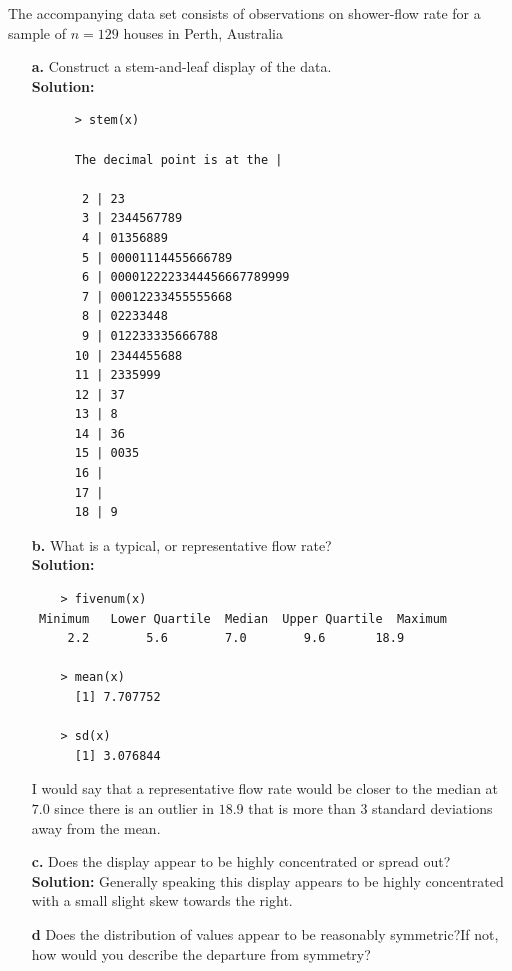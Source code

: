 \documentclass[12pt]{article}
\makeatletter
\theoremstyle{homework}
\newenvironment{exercise}[1]
{\def\@currentlabel{#1}\exercisecore}
{\endexercisecore}
\makeatother
\begin{document}
\begin{exercise}{1.14} The accompanying data set consists of observations on shower-flow rate for a sample of $n = 129$ houses in Perth, Australia
  \begin{enumerate}
    \item[\textbf{a.}] Construct a stem-and-leaf display of the data.\\
    \textbf{Solution:}
    \begin{lstlisting}
      > stem(x)

      The decimal point is at the |
    
       2 | 23
       3 | 2344567789
       4 | 01356889
       5 | 00001114455666789
       6 | 0000122223344456667789999
       7 | 00012233455555668
       8 | 02233448
       9 | 012233335666788
      10 | 2344455688
      11 | 2335999
      12 | 37
      13 | 8
      14 | 36
      15 | 0035
      16 | 
      17 | 
      18 | 9    
    \end{lstlisting}

    \vspace{.5in}
     
    \item[\textbf{b.}] What is a typical, or representative flow rate?\\
    
    \textbf{Solution:}
    
    \begin{lstlisting}
    > fivenum(x)
 Minimum   Lower Quartile  Median  Upper Quartile  Maximum 
     2.2        5.6        7.0        9.6       18.9 
      
    > mean(x)
      [1] 7.707752
  
    > sd(x)
      [1] 3.076844
    \end{lstlisting}
    I would say that a representative flow rate would be closer to the median at $7.0$ since there is an outlier in $18.9$ that is more than 3 standard deviations away from the mean.
    \vspace{.5in}
     
    \item[\textbf{c.}] Does the display appear to be highly concentrated or spread out?\\
    
    \textbf{Solution:} Generally speaking this display appears to be highly concentrated with a small slight skew towards the right.
    \vspace{.5in}
     

    \item[\textbf{d}] Does the distribution of values appear to be reasonably symmetric?If not, how would you describe the departure from symmetry?\\
    

\end{enumerate}
\end{exercise}
\end{document}
